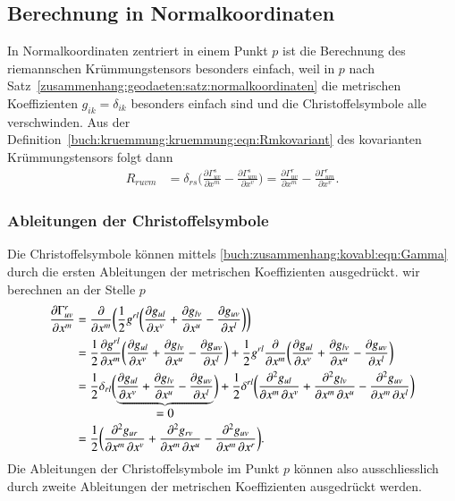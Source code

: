 %
%
\subsection{Berechnung in Normalkoordinaten}
In Normalkoordinaten zentriert in einem Punkt $p$ ist die Berechnung
des riemannschen Krümmungstensors besonders einfach, weil in $p$
nach Satz~\ref{zusammenhang:geodaeten:satz:normalkoordinaten} die
metrischen Koeffizienten $g_{ik}=\delta_{ik}$ besonders einfach sind
und die Christoffelsymbole alle verschwinden.
Aus der Definition~\eqref{buch:kruemmung:kruemmung:eqn:Rmkovariant}
des kovarianten Krümmungstensors folgt dann
\begin{align}
R_{ruvm}
&=
\delta_{rs}
\biggl(
\frac{\partial \Gamma^s_{uv}}{\partial x^m}
-
\frac{\partial \Gamma^s_{um}}{\partial x^v}
\biggr)
=
\frac{\partial \Gamma^r_{uv}}{\partial x^m}
-
\frac{\partial \Gamma^r_{um}}{\partial x^v}.
\label{buch:kruemmung:kruemmung:eqn:Rruvm}
\end{align}

%
%
\subsubsection{Ableitungen der Christoffelsymbole}
Die Christoffelsymbole können mittels
\eqref{buch:zusammenhang:kovabl:eqn:Gamma}
durch die ersten Ableitungen der metrischen Koeffizienten ausgedrückt.
wir berechnen an der Stelle $p$
\begin{align}
\frac{\partial \Gamma^r_{uv}}{\partial x^m}
&=
\frac{\partial}{\partial x^m}\biggl(
\frac12g^{rl}
\biggl(
\frac{\partial g_{ul}}{\partial x^v}
+
\frac{\partial g_{lv}}{\partial x^u}
-
\frac{\partial g_{uv}}{\partial x^l}
\biggr)
\biggr)
\notag
\\
&=
\frac12\frac{\partial g^{rl}}{\partial x^m}
\biggl(
\frac{\partial g_{ul}}{\partial x^v}
+
\frac{\partial g_{lv}}{\partial x^u}
-
\frac{\partial g_{uv}}{\partial x^l}
\biggr)
+
\frac12 g^{rl}
\frac{\partial}{\partial x^m}
\biggl(
\frac{\partial g_{ul}}{\partial x^v}
+
\frac{\partial g_{lv}}{\partial x^u}
-
\frac{\partial g_{uv}}{\partial x^l}
\biggr)
\notag
\\
&=
\frac12
\delta_{rl}
\biggl(
\underbrace{
\frac{\partial g_{ul}}{\partial x^v}
+
\frac{\partial g_{lv}}{\partial x^u}
-
\frac{\partial g_{uv}}{\partial x^l}
}_{\displaystyle=0}
\biggr)
+
\frac12\delta^{rl}
\biggl(
\frac{\partial^2 g_{ul}}{\partial x^m\,\partial x^v}
+
\frac{\partial^2 g_{lv}}{\partial x^m\,\partial x^u}
-
\frac{\partial^2 g_{uv}}{\partial x^m\,\partial x^l}
\biggr)
\notag
\\
&=
\frac12\biggl(
\frac{\partial^2 g_{ur}}{\partial x^m\,\partial x^v}
+
\frac{\partial^2 g_{rv}}{\partial x^m\,\partial x^u}
-
\frac{\partial^2 g_{uv}}{\partial x^m\,\partial x^r}
\biggr).
\label{buch:kruemmung:kruemmung:eqn:RGamma2}
\end{align}
Die Ableitungen der Christoffelsymbole im Punkt $p$ können also
ausschliesslich durch zweite Ableitungen der metrischen Koeffizienten
ausgedrückt werden.

